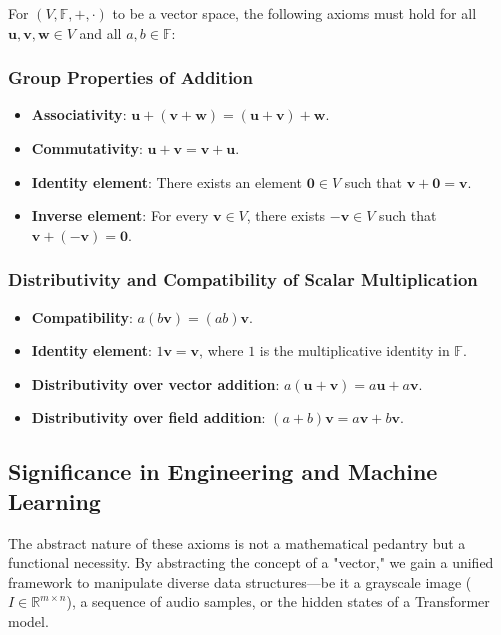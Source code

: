 For $(V, \mathbb{F}, +, \cdot)$ to be a vector space, the following axioms must hold for all $\mathbf{u}, \mathbf{v}, \mathbf{w} \in V$ and all $a, b \in \mathbb{F}$:

\subsubsection*{Group Properties of Addition}
\begin{itemize}
    \item \textbf{Associativity}: $\mathbf{u} + (\mathbf{v} + \mathbf{w}) = (\mathbf{u} + \mathbf{v}) + \mathbf{w}$.
    \item \textbf{Commutativity}: $\mathbf{u} + \mathbf{v} = \mathbf{v} + \mathbf{u}$.
    \item \textbf{Identity element}: There exists an element $\mathbf{0} \in V$ such that $\mathbf{v} + \mathbf{0} = \mathbf{v}$.
    \item \textbf{Inverse element}: For every $\mathbf{v} \in V$, there exists $-\mathbf{v} \in V$ such that $\mathbf{v} + (-\mathbf{v}) = \mathbf{0}$.
\end{itemize}

\subsubsection*{Distributivity and Compatibility of Scalar Multiplication}
\begin{itemize}
    \item \textbf{Compatibility}: $a(b\mathbf{v}) = (ab)\mathbf{v}$.
    \item \textbf{Identity element}: $1\mathbf{v} = \mathbf{v}$, where $1$ is the multiplicative identity in $\mathbb{F}$.
    \item \textbf{Distributivity over vector addition}: $a(\mathbf{u} + \mathbf{v}) = a\mathbf{u} + a\mathbf{v}$.
    \item \textbf{Distributivity over field addition}: $(a + b)\mathbf{v} = a\mathbf{v} + b\mathbf{v}$.
\end{itemize}

\subsection{Significance in Engineering and Machine Learning}

The abstract nature of these axioms is not a mathematical pedantry but a functional necessity. By abstracting the concept of a "vector," we gain a unified framework to manipulate diverse data structures—be it a grayscale image ($I \in \mathbb{R}^{m \times n}$), a sequence of audio samples, or the hidden states of a Transformer model.


